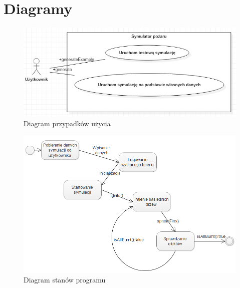 \documentclass[a4paper, 11pt]{article}
\begin{document}
	
	\section*{Diagramy}
	\indent
	
	\begin{figure}[H]
		\centerline{\includegraphics[scale=0.9]{usecase1}}
		\raggedright{	\caption{Diagram przypadków użycia}}
	\end{figure}
		\begin{figure}[H]
			\centerline{\includegraphics[scale=0.7]{state}}
			\raggedright{	\caption{Diagram stanów programu}}
		\end{figure}
	
\end{document}
